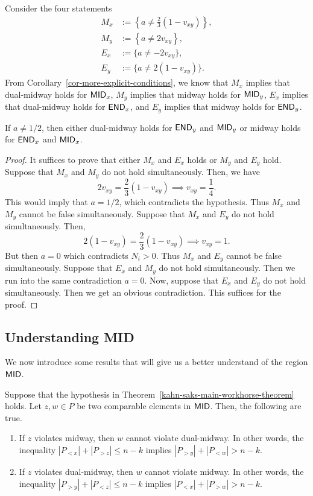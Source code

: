\documentclass{puthesis-UG}
\begin{document}
Consider the four statements 
\begin{align*}
	M_x & := \left \{ a \neq \frac{2}{3} (1 - v_{xy}) \right \}, \\
	M_y & := \left \{ a \neq 2v_{xy} \right \}, \\
	E_x & := \{ a \neq -2v_{xy} \}, \\
	E_y & := \{ a \neq 2 ( 1 - v_{xy}) \}.
\end{align*}
From Corollary~\ref{cor-more-explicit-conditions}, we know that $M_x$ implies that dual-midway holds for $\mathsf{MID}_x$, $M_y$ implies that midway holds for $\mathsf{MID}_y$, $E_x$ implies that dual-midway holds for $\mathsf{END}_x$, and $E_y$ implies that midway holds for $\mathsf{END}_y$.

\begin{lem} \label{lem-when-a-not-half-then-either-mid-or-dual-mid}
	If $a \neq 1/2$, then either dual-midway holds for $\mathsf{END}_y$ and $\mathsf{MID}_y$ or midway holds for $\mathsf{END}_x$ and $\mathsf{MID}_x$.
\end{lem}

\begin{proof}
	It suffices to prove that either $M_x$ and $E_x$ holds or $M_y$ and $E_y$ hold. Suppose that $M_x$ and $M_y$ do not hold simultaneously. Then, we have 
	\[
		2v_{xy} = \frac{2}{3} (1 - v_{xy}) \implies v_{xy} = \frac{1}{4}.
	\]
	This would imply that $a = 1/2$, which contradicts the hypothesis. Thus $M_x$ and $M_y$ cannot be false simultaneously. Suppose that $M_x$ and $E_y$ do not hold simultaneously. Then, 
	\[
		2(1 -v_{xy}) = \frac{2}{3} (1 - v_{xy}) \implies v_{xy} = 1.
	\]
	But then $a = 0$ which contradicts $N_i > 0$. Thus $M_x$ and $E_y$ cannot be false simultaneously. Suppose that $E_x$ and $M_y$ do not hold simultaneously. Then we run into the same contradiction $a = 0$. Now, suppose that $E_x$ and $E_y$ do not hold simultaneously. Then we get an obvious contradiction. This suffices for the proof.  
\end{proof}



\subsection{Understanding MID}

We now introduce some results that will give us a better understand of the region $\mathsf{MID}$.

\begin{lem} \label{lem-simultaneously-violate-mid-and-dual-mid}
	Suppose that the hypothesis in Theorem~\ref{kahn-saks-main-workhorse-theorem} holds. Let $z, w \in P$ be two comparable elements in $\mathsf{MID}$. Then, the following are true. 
	\begin{enumerate}[label = (\alph*)]
		\item If $z$ violates midway, then $w$ cannot violate dual-midway. In other words, the inequality $|P_{< x}| + |P_{> z}| \leq n-k$ implies $|P_{> y}| + |P_{< w}| > n-k$. 
		\item If $z$ violates dual-midway, then $w$ cannot violate midway. In other words, the inequality $|P_{> y}| + |P_{< z}| \leq n-k$ implies $|P_{<x}| + |P_{>w}| > n-k$. 
	\end{enumerate}
\end{lem}
\end{document}
